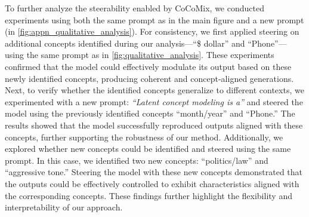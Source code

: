 \documentclass[]{fairmeta}
\newcommand{\sname}{CoCoMix\xspace}
\begin{document}
To further analyze the steerability enabled by \sname, we conducted experiments using both the same prompt as in the main figure and a new prompt (in \autoref{fig:appn_qualitative_analysis}). For consistency, we first applied steering on additional concepts identified during our analysis—``\$ dollar'' and ``Phone''—using the same prompt as in \autoref{fig:qualitative_analysis}. These experiments confirmed that the model could effectively modulate its output based on these newly identified concepts, producing coherent and concept-aligned generations. Next, to verify whether the identified concepts generalize to different contexts, we experimented with a new prompt: \textit{``Latent concept modeling is a''} and steered the model using the previously identified concepts ``month/year'' and ``Phone.'' The results showed that the model successfully reproduced outputs aligned with these concepts, further supporting the robustness of our method. Additionally, we explored whether new concepts could be identified and steered using the same prompt. In this case, we identified two new concepts: ``politics/law'' and ``aggressive tone.'' Steering the model with these new concepts demonstrated that the outputs could be effectively controlled to exhibit characteristics aligned with the corresponding concepts. These findings further highlight the flexibility and interpretability of our approach.
\end{document}
